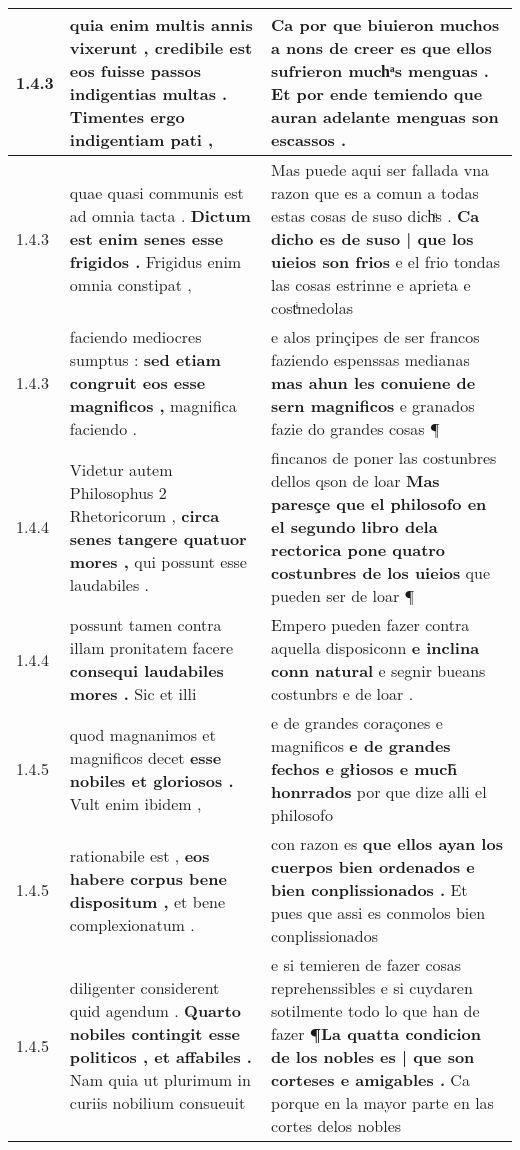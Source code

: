 \begin{tabular}{|p{1cm}|p{6.5cm}|p{6.5cm}|}
1.4.3 & quia enim multis annis vixerunt , \textbf{ credibile est eos fuisse passos indigentias multas . } Timentes ergo indigentiam pati , & Ca por que biuieron muchos a nons de creer es \textbf{ que ellos sufrieron muchͣs menguas . } Et por ende temiendo que auran adelante menguas son escassos . \\\hline
1.4.3 & quae quasi communis est ad omnia tacta . \textbf{ Dictum est enim senes esse frigidos . } Frigidus enim omnia constipat , & Mas puede aqui ser fallada vna razon que es a comun a todas estas cosas de suso dichͣs . \textbf{ Ca dicho es de suso | que los uieios son frios } e el frio tondas las cosas estrinne e aprieta e costͥmedolas \\\hline
1.4.3 & faciendo mediocres sumptus : \textbf{ sed etiam congruit eos esse magnificos , } magnifica faciendo . & e alos prinçipes de ser francos faziendo espenssas medianas \textbf{ mas ahun les conuiene de sern magnificos } e granados fazie do grandes cosas ¶ \\\hline
1.4.4 & Videtur autem Philosophus 2 Rhetoricorum , \textbf{ circa senes tangere quatuor mores , } qui possunt esse laudabiles . & fincanos de poner las costunbres dellos qson de loar \textbf{ Mas paresçe que el philosofo en el segundo libro dela rectorica pone quatro costunbres de los uieios } que pueden ser de loar ¶ \\\hline
1.4.4 & possunt tamen contra illam pronitatem facere \textbf{ consequi laudabiles mores . } Sic et illi & Empero pueden fazer contra aquella disposiconn \textbf{ e inclina conn natural } e segnir bueans costunbrs e de loar . \\\hline
1.4.5 & quod magnanimos et magnificos decet \textbf{ esse nobiles et gloriosos . } Vult enim ibidem , & e de grandes coraçones e magnificos \textbf{ e de grandes fechos e głiosos e much̃ honrrados } por que dize alli el philosofo \\\hline
1.4.5 & rationabile est , \textbf{ eos habere corpus bene dispositum , } et bene complexionatum . & con razon es \textbf{ que ellos ayan los cuerpos bien ordenados e bien conplissionados . } Et pues que assi es conmolos bien conplissionados \\\hline
1.4.5 & diligenter considerent quid agendum . \textbf{ Quarto nobiles contingit esse politicos , et affabiles . } Nam quia ut plurimum in curiis nobilium consueuit & e si temieren de fazer cosas reprehenssibles e si cuydaren sotilmente todo lo que han de fazer \textbf{ ¶La quatta condicion de los nobles es | que son corteses e amigables . } Ca porque en la mayor parte en las cortes delos nobles \\\hline

\end{tabular}
